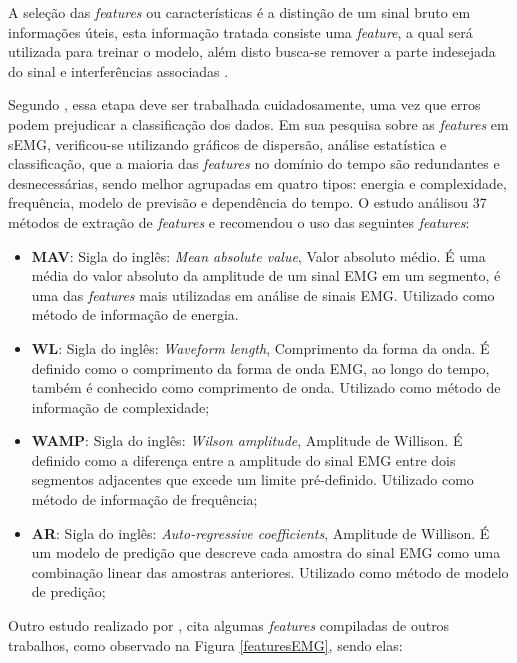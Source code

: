 A seleção das \textit{features} ou características é a distinção de um sinal bruto em informações úteis, esta informação tratada consiste uma \textit{feature}, a qual será utilizada para treinar o modelo, além disto busca-se remover a parte indesejada do sinal e interferências associadas \cite{phinyomark2012feature}.

Segundo , essa etapa deve ser trabalhada cuidadosamente, uma vez que erros podem prejudicar a classificação dos dados. Em sua pesquisa sobre as \textit{features} em sEMG, verificou-se utilizando gráficos de dispersão, análise estatística e classificação, que a maioria das \textit{features} no domínio do tempo são redundantes e desnecessárias, sendo melhor agrupadas em quatro tipos: energia e complexidade, frequência, modelo de previsão e dependência do tempo. O estudo análisou 37 métodos de extração de \textit{features} e recomendou o uso das seguintes \textit{features}:

\begin{itemize}
    \item \textbf{MAV}: Sigla do inglês: \textit{Mean absolute value}, Valor absoluto médio. É uma média do valor absoluto da amplitude de um sinal EMG em um segmento, é uma das \textit{features} mais utilizadas em análise de sinais EMG. Utilizado como método de informação de energia.
    \item \textbf{WL}: Sigla do inglês: \textit{Waveform length}, Comprimento da forma da onda. É definido como o comprimento da forma de onda EMG, ao longo do tempo, também
    é conhecido como comprimento de onda. Utilizado como método de informação de complexidade;
    \item \textbf{WAMP}: Sigla do inglês: \textit{Wilson amplitude}, Amplitude de Willison. É definido como a diferença entre a amplitude do sinal EMG entre dois segmentos adjacentes que excede um limite pré-definido. Utilizado como método de informação de frequência;
    \item \textbf{AR}: Sigla do inglês: \textit{Auto-regressive coefficients}, Amplitude de Willison. É um modelo de predição que descreve cada amostra do sinal EMG como uma combinação linear das amostras anteriores. Utilizado como método de modelo de predição;
\end{itemize}

Outro estudo realizado por , cita algumas \textit{features} compiladas de outros trabalhos, como observado na Figura \ref{featuresEMG}, sendo elas:

